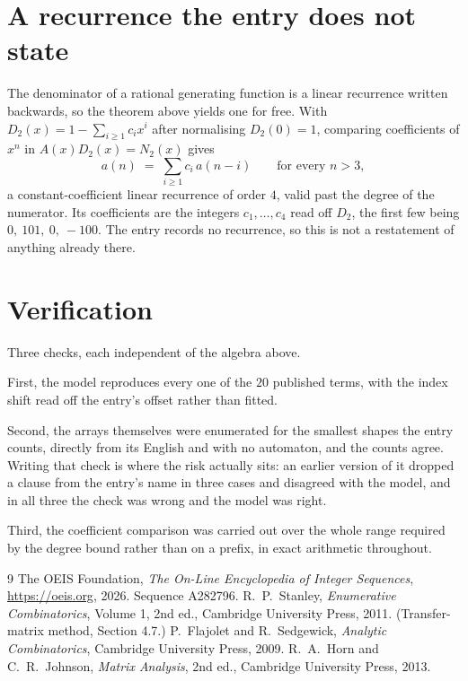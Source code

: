 \documentclass[11pt,a4paper]{article}
\theoremstyle{plain}
\theoremstyle{definition}
\begin{document}
\section{A recurrence the entry does not state}

The denominator of a rational generating function is a linear recurrence written backwards, so
the theorem above yields one for free. With $D_2(x)=1-\sum_{i\ge1}c_ix^i$ after normalising
$D_2(0)=1$, comparing coefficients of $x^n$ in $A(x)D_2(x)=N_2(x)$ gives
\[
a(n)\;=\;\sum_{i\ge1}c_i\,a(n-i)\qquad\text{for every }n>3,
\]
a constant-coefficient linear recurrence of order $4$, valid past the degree of the
numerator. Its coefficients are the integers $c_1,\dots,c_{4}$ read off $D_2$, the first few being $0,\ 101,\ 0,\ -100$. The entry records no recurrence, so this is not a restatement of anything
already there.

\section{Verification}

Three checks, each independent of the algebra above.

First, the model reproduces every one of the $20$ published terms, with the index shift
read off the entry's offset rather than fitted.

Second, the arrays themselves were enumerated for the smallest shapes the entry counts,
directly from its English and with no automaton, and the counts agree. Writing that check is
where the risk actually sits: an earlier version of it dropped a clause from the entry's name
in three cases and disagreed with the model, and in all three the check was wrong and the model
was right.

Third, the coefficient comparison was carried out over the whole range required by the degree
bound rather than on a prefix, in exact arithmetic throughout.

\begin{thebibliography}{9}
 The OEIS Foundation, \emph{The On-Line Encyclopedia of Integer
Sequences}, \url{https://oeis.org}, 2026. Sequence A282796.
 R.~P.~Stanley, \emph{Enumerative Combinatorics}, Volume 1, 2nd ed.,
Cambridge University Press, 2011. (Transfer-matrix method, Section 4.7.)
 P.~Flajolet and R.~Sedgewick, \emph{Analytic Combinatorics}, Cambridge
University Press, 2009.
 R.~A.~Horn and C.~R.~Johnson, \emph{Matrix Analysis}, 2nd ed., Cambridge
University Press, 2013.
\end{thebibliography}
\end{document}
